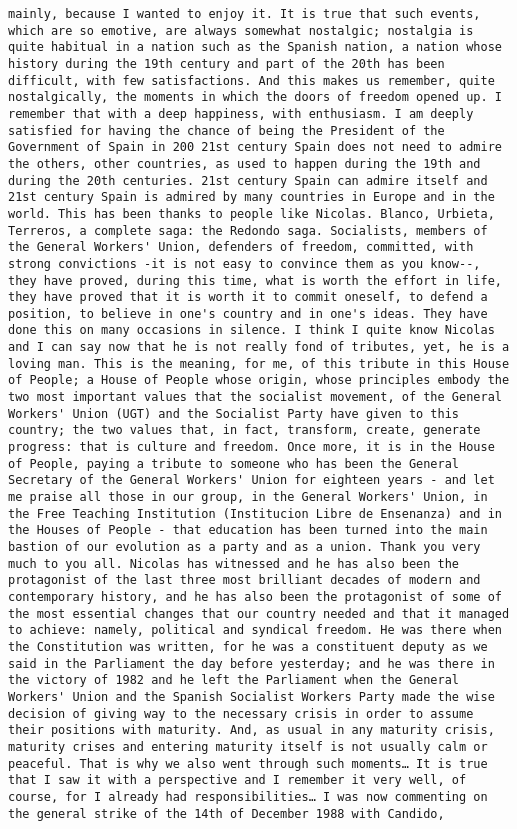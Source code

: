 \documentclass[
]{article}
\begin{document}
\begin{verbatim}
mainly, because I wanted to enjoy it. It is true that such events, which are so emotive, are always somewhat nostalgic; nostalgia is quite habitual in a nation such as the Spanish nation, a nation whose history during the 19th century and part of the 20th has been difficult, with few satisfactions. And this makes us remember, quite nostalgically, the moments in which the doors of freedom opened up. I remember that with a deep happiness, with enthusiasm. I am deeply satisfied for having the chance of being the President of the Government of Spain in 200 21st century Spain does not need to admire the others, other countries, as used to happen during the 19th and during the 20th centuries. 21st century Spain can admire itself and 21st century Spain is admired by many countries in Europe and in the world. This has been thanks to people like Nicolas. Blanco, Urbieta, Terreros, a complete saga: the Redondo saga. Socialists, members of the General Workers' Union, defenders of freedom, committed, with strong convictions -it is not easy to convince them as you know--, they have proved, during this time, what is worth the effort in life, they have proved that it is worth it to commit oneself, to defend a position, to believe in one's country and in one's ideas. They have done this on many occasions in silence. I think I quite know Nicolas and I can say now that he is not really fond of tributes, yet, he is a loving man. This is the meaning, for me, of this tribute in this House of People; a House of People whose origin, whose principles embody the two most important values that the socialist movement, of the General Workers' Union (UGT) and the Socialist Party have given to this country; the two values that, in fact, transform, create, generate progress: that is culture and freedom. Once more, it is in the House of People, paying a tribute to someone who has been the General Secretary of the General Workers' Union for eighteen years - and let me praise all those in our group, in the General Workers' Union, in the Free Teaching Institution (Institucion Libre de Ensenanza) and in the Houses of People - that education has been turned into the main bastion of our evolution as a party and as a union. Thank you very much to you all. Nicolas has witnessed and he has also been the protagonist of the last three most brilliant decades of modern and contemporary history, and he has also been the protagonist of some of the most essential changes that our country needed and that it managed to achieve: namely, political and syndical freedom. He was there when the Constitution was written, for he was a constituent deputy as we said in the Parliament the day before yesterday; and he was there in the victory of 1982 and he left the Parliament when the General Workers' Union and the Spanish Socialist Workers Party made the wise decision of giving way to the necessary crisis in order to assume their positions with maturity. And, as usual in any maturity crisis, maturity crises and entering maturity itself is not usually calm or peaceful. That is why we also went through such moments… It is true that I saw it with a perspective and I remember it very well, of course, for I already had responsibilities… I was now commenting on the general strike of the 14th of December 1988 with Candido, 
\end{verbatim}
\end{document}
